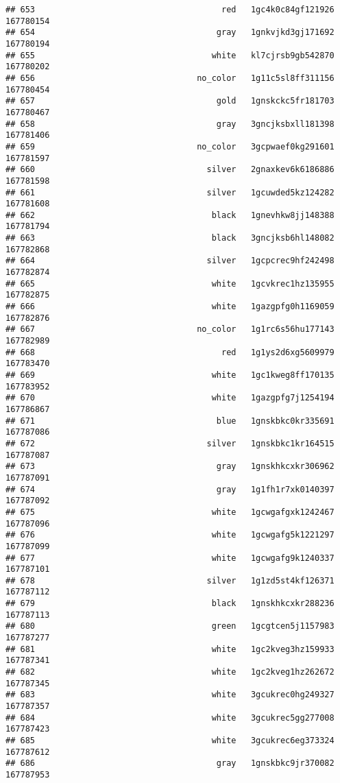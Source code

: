 \documentclass[
]{article}
\begin{document}
\begin{verbatim}
## 653                                      red   1gc4k0c84gf121926 167780154
## 654                                     gray   1gnkvjkd3gj171692 167780194
## 655                                    white   kl7cjrsb9gb542870 167780202
## 656                                 no_color   1g11c5sl8ff311156 167780454
## 657                                     gold   1gnskckc5fr181703 167780467
## 658                                     gray   3gncjksbxll181398 167781406
## 659                                 no_color   3gcpwaef0kg291601 167781597
## 660                                   silver   2gnaxkev6k6186886 167781598
## 661                                   silver   1gcuwded5kz124282 167781608
## 662                                    black   1gnevhkw8jj148388 167781794
## 663                                    black   3gncjksb6hl148082 167782868
## 664                                   silver   1gcpcrec9hf242498 167782874
## 665                                    white   1gcvkrec1hz135955 167782875
## 666                                    white   1gazgpfg0h1169059 167782876
## 667                                 no_color   1g1rc6s56hu177143 167782989
## 668                                      red   1g1ys2d6xg5609979 167783470
## 669                                    white   1gc1kweg8ff170135 167783952
## 670                                    white   1gazgpfg7j1254194 167786867
## 671                                     blue   1gnskbkc0kr335691 167787086
## 672                                   silver   1gnskbkc1kr164515 167787087
## 673                                     gray   1gnskhkcxkr306962 167787091
## 674                                     gray   1g1fh1r7xk0140397 167787092
## 675                                    white   1gcwgafgxk1242467 167787096
## 676                                    white   1gcwgafg5k1221297 167787099
## 677                                    white   1gcwgafg9k1240337 167787101
## 678                                   silver   1g1zd5st4kf126371 167787112
## 679                                    black   1gnskhkcxkr288236 167787113
## 680                                    green   1gcgtcen5j1157983 167787277
## 681                                    white   1gc2kveg3hz159933 167787341
## 682                                    white   1gc2kveg1hz262672 167787345
## 683                                    white   3gcukrec0hg249327 167787357
## 684                                    white   3gcukrec5gg277008 167787423
## 685                                    white   3gcukrec6eg373324 167787612
## 686                                     gray   1gnskbkc9jr370082 167787953

\end{verbatim}
\end{document}
